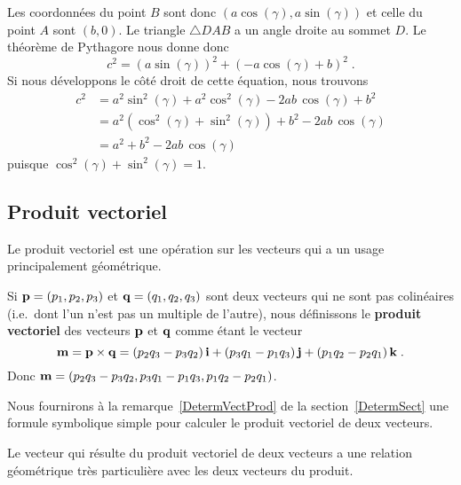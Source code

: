 {\begin{rmk}[\theory]

Les coordonnées du point $B$ sont donc
$(a\cos(\gamma), a \sin(\gamma))$ et celle du point $A$ sont $(b,0)$.
Le triangle $\triangle DAB$ a un angle droite au sommet $D$.  Le
théorème de Pythagore nous donne donc
\[
c^2 = \left( a\sin(\gamma) \right)^2 + \left( -a\cos(\gamma) + b\right)^2 \; .
\]
Si nous développons le côté droit de cette équation, nous trouvons
\begin{align*}
c^2 &= a^2 \sin^2(\gamma) + a^2 \cos^2(\gamma) - 2 ab\, \cos(\gamma) +b^2 \\
&= a^2 \left(\cos^2(\gamma)+\sin^2(\gamma)\right) + b^2 - 2ab\,\cos(\gamma) \\
&= a^2 + b^2 - 2ab\,\cos(\gamma)
\end{align*}
puisque $\cos^2(\gamma) + \sin^2(\gamma) = 1$.
\end{rmk}

\subsection{Produit vectoriel \eng}\label{PROD_VECT}

Le produit vectoriel est une opération sur les vecteurs qui a un
usage principalement géométrique.

\begin{defn} 
Si $\mathbf{p} = (p_1,p_2,p_3)$ et $\mathbf{q} = (q_1, q_2, q_3)$ sont deux
vecteurs qui ne sont pas colinéaires (i.e.\ dont l'un n'est pas un
multiple de l'autre), nous définissons le
{\bfseries produit vectoriel} des vecteurs
$\mathbf{p}$ et $\mathbf{q}$ comme étant le vecteur
\begin{equation}\label{sp_form}
\mathbf{m} = \mathbf{p} \times \mathbf{q} =
\left(p_2 q_3 - p_3 q_2\right)\mathbf{i} + \left(p_3 q_1 - p_1 q_3\right) \mathbf{j}
+ \left(p_1 q_2 - p_2 q_1\right) \mathbf{k} \; .
\end{equation}
Donc $\mathbf{m} = \left(p_2 q_3 - p_3 q_2, p_3 q_1 - p_1 q_3,
p_1 q_2 - p_2 q_1\right)$.
\label{VecTProdDef}
\end{defn}

Nous fournirons à la remarque~\ref{DetermVectProd} de la
section~\ref{DetermSect} une formule symbolique simple pour calculer
le produit vectoriel de deux vecteurs.

Le vecteur qui résulte du produit vectoriel de deux vecteurs a une relation
géométrique très particulière avec les deux vecteurs du produit.

}
